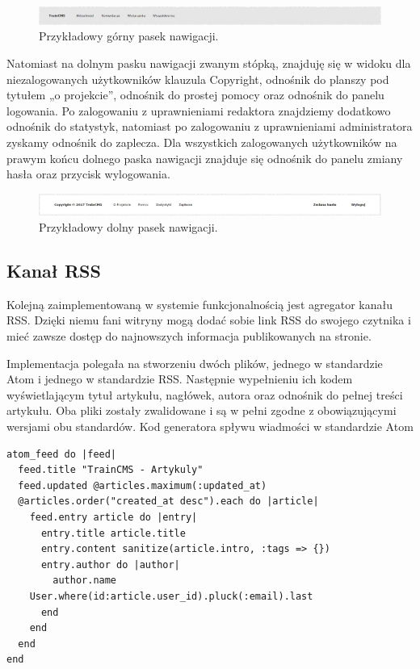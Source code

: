 \documentclass[openright]{xmgr}
\begin{document}
\begin{figure}[!tbh]
\centering
\includegraphics[width=\linewidth]{fig/navbar}
\caption{Przykładowy górny pasek nawigacji.}
\end{figure}

Natomiast na dolnym pasku nawigacji zwanym stópką, znajduję się w widoku dla niezalogowanych użytkowników klauzula Copyright, odnośnik do planszy pod tytułem „o projekcie”, odnośnik do prostej pomocy oraz odnośnik do panelu logowania. Po zalogowaniu z uprawnieniami redaktora znajdziemy dodatkowo odnośnik do statystyk, natomiast po zalogowaniu z uprawnieniami administratora zyskamy odnośnik do zaplecza. Dla wszystkich zalogowanych użytkowników na prawym końcu dolnego paska nawigacji znajduje się odnośnik do panelu zmiany hasła oraz przycisk wylogowania.

\begin{figure}[!tbh]
\centering
\includegraphics[width=\linewidth]{fig/footbar}
\caption{Przykładowy dolny pasek nawigacji.}
\end{figure}

\newpage

\subsection{Kanał RSS}
Kolejną zaimplementowaną w systemie funkcjonalnością jest agregator kanału RSS. Dzięki niemu fani witryny mogą dodać sobie link RSS do swojego czytnika i mieć zawsze dostęp do najnowszych informacja publikowanych na stronie. 

Implementacja polegała na stworzeniu dwóch plików, jednego w standardzie Atom i jednego w standardzie RSS. Następnie wypełnieniu ich kodem wyświetlającym tytuł artykułu, nagłówek, autora oraz odnośnik do pełnej treści artykułu. Oba pliki zostały zwalidowane i są w pełni zgodne z obowiązującymi wersjami obu standardów.
Kod generatora spływu wiadmości w standardzie Atom

\begin{lstlisting}[language=ruby2, caption={Kod generatora spływu wiadmości w standardzie Atom}]
atom_feed do |feed|
  feed.title "TrainCMS - Artykuly"
  feed.updated @articles.maximum(:updated_at)
  @articles.order("created_at desc").each do |article|
    feed.entry article do |entry|
      entry.title article.title
      entry.content sanitize(article.intro, :tags => {})
      entry.author do |author|
        author.name 
	User.where(id:article.user_id).pluck(:email).last
      end
    end
  end
end
\end{lstlisting}
\end{document}
